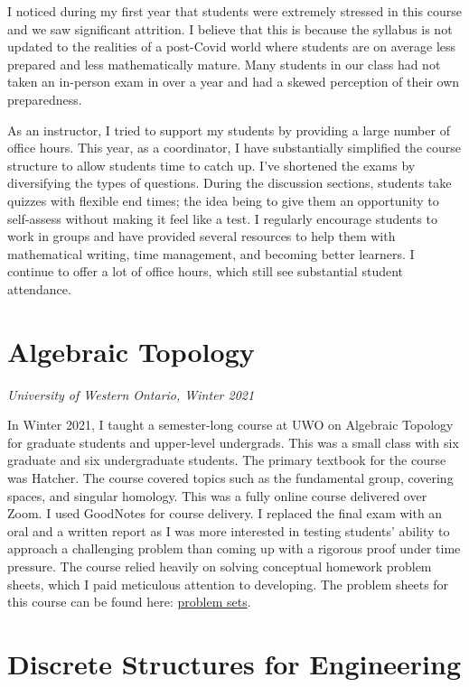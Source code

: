 \documentclass[
]{report}
\begin{document}
I noticed during my first year that students were extremely stressed in this course and we saw significant attrition.
I believe that this is because the syllabus is not updated to the realities of a post-Covid world where students are on average less prepared and less mathematically mature.
Many students in our class had not taken an in-person exam in over a year and had a skewed perception of their own preparedness.

As an instructor, I tried to support my students by providing a large number of office hours.
This year, as a coordinator, I have substantially simplified the course structure to allow students time to catch up.
I've shortened the exams by diversifying the types of questions.
During the discussion sections, students take quizzes with flexible end times; the idea being to give them an opportunity to self-assess without making it feel like a test.
I regularly encourage students to work in groups and have provided several resources to help them with mathematical writing, time management, and becoming better learners.
I continue to offer a lot of office hours, which still see substantial student attendance.

\hypertarget{algebraic-topology}{%
\section{Algebraic Topology}\label{algebraic-topology}}

\emph{University of Western Ontario, Winter 2021}

In Winter 2021, I taught a semester-long course at UWO on Algebraic Topology for graduate students and upper-level undergrads. This was a small class with six graduate and six undergraduate students. The primary textbook for the course was Hatcher. The course covered topics such as the fundamental group, covering spaces, and singular homology. This was a fully online course delivered over Zoom. I used GoodNotes for course delivery. I replaced the final exam with an oral and a written report as I was more interested in testing students' ability to approach a challenging problem than coming up with a rigorous proof under time pressure. The course relied heavily on solving conceptual homework problem sheets, which I paid meticulous attention to developing.
The problem sheets for this course can be found here: \href{https://github.com/apurvnakade/uwo2021-algebraic-topology/tree/main/output}{problem sets}.

\hypertarget{discrete-structures-for-engineering}{%
\section{Discrete Structures for Engineering}\label{discrete-structures-for-engineering}}
\end{document}
